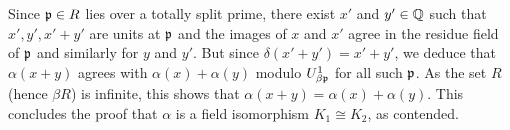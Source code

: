 Since $\mathfrak{p} \in R$ lies over a totally split prime, there exist $x'$ and $y' \in \mathbb{Q}$ such that $x',y',x'+y'$ are units at $\mathfrak{p}$ and the images of $x$ and $x'$ agree in the residue field of $\mathfrak{p}$ and similarly for $y$ and $y'$.
But since $\delta(x'+y') = x'+y'$, we deduce that $\alpha(x+y)$ agrees with $\alpha(x) + \alpha(y)$ modulo $U_{\beta\mathfrak{p}}^{1}$ for all such $\mathfrak{p}$.
As the set $R$ (hence $\beta R$) is infinite, this shows that $\alpha(x+y) = \alpha(x) + \alpha(y)$.
This concludes the proof that $\alpha$ is a field isomorphism $K_{1} \cong K_{2}$, as contended.

